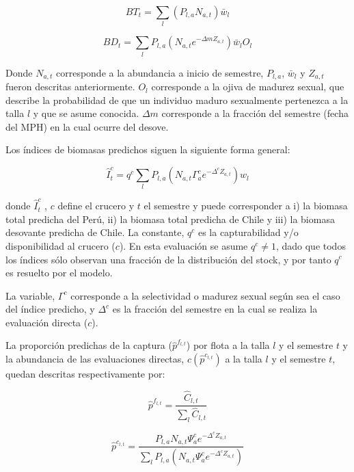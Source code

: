 \documentclass[letter,11pt]{article}
\begin{document}
\begin{equation}
BT_t=\sum_{l}\left(P_{l,a}N_{a,t}\right)\bar{w}_l
\end{equation}

\begin{equation}
BD_t=\sum_{l}P_{l,a}\left(N_{a,t}e^{-\Delta m Z_{a,t}}\right)\bar{w}_l O_l
\end{equation}

Donde $N_{a,t}$ corresponde a la abundancia a inicio de semestre,
$P_{l,a}$, $\bar{w}_l$ y $Z_{a,t}$ fueron descritas
anteriormente. $O_l$ corresponde a la ojiva de madurez sexual, que
describe la probabilidad de que un individuo maduro sexualmente
pertenezca a la talla $l$ y que se asume conocida. $\Delta m$
corresponde a la fracci\'on del semestre (fecha del MPH) en la cual ocurre
del desove.

Los \'indices de biomasas predichos siguen la siguiente forma general:

\begin{equation}
\hat{I}^c_t=q^c\sum_{l}P_{l,a}\left(N_{a,t}\Gamma^c_a e^{-\Delta^c Z_{a,t}}\right)w_l
\end{equation}

donde $\hat{I}_t^c$ , $c$ define el crucero y $t$ el semestre y
puede corresponder a i) la biomasa total predicha del Per\'u, ii) la
biomasa total predicha de Chile y iii) la biomasa desovante predicha de
Chile. La constante, $q^c$ es la capturabilidad y/o disponibilidad al
crucero ($c$). En esta evaluaci\'on se asume $q^c\not=1$, dado que
todos los \'indices s\'olo observan una fracci\'on de la distribuci\'on del
stock, y por tanto $q^c$ es resuelto por el modelo.

La variable, $\Gamma^c$ corresponde a la selectividad o madurez sexual
seg\'un sea el caso del \'indice predicho, y $\Delta^c$ es la fracci\'on del
semestre en la cual se realiza la evaluaci\'on directa ($c$).

La proporci\'on predichas de la captura ($\hat{p}^{f_{l,t}}$) por flota
a la talla $l$ y el semestre $t$ y la abundancia de las evaluaciones
directas, $c(\hat{p}^{c_{l,t}})$ a la talla $l$ y el semestre $t$,
quedan descritas respectivamente por:

\begin{equation}
\hat{p}^{f_{l,t}}=\frac{\hat{C}_{l,t}}{\sum_{l}\hat{C}_{l,t}}
\end{equation}

\begin{equation}
\hat{p}^{c_{l,t}}=\frac{P_{l,a}N_{a,t}\Psi^c_a e^{-\Delta^cZ_{a,t}}}{\sum_{l}P_{l,a} \left( N_{a,t}\Psi^c_a e^{-\Delta^cZ_{a,t}}\right)} 
\end{equation}
\end{document}
